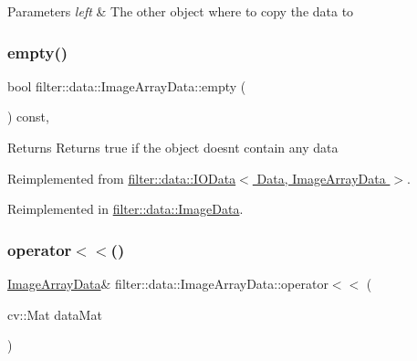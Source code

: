 \begin{DoxyParams}{Parameters}
{\em left} & The other object where to copy the data to \\
\hline
\end{DoxyParams}
\mbox{\label{classfilter_1_1data_1_1_image_array_data_ac30c0a0384b1133a8c177e399ff9d140}} 
\subsubsection{\texorpdfstring{empty()}{empty()}}
{\footnotesize\ttfamily bool filter\+::data\+::\+Image\+Array\+Data\+::empty (\begin{DoxyParamCaption}{ }\end{DoxyParamCaption}) const\hspace{0.3cm}{\ttfamily [inline]}, {\ttfamily [virtual]}}

\begin{DoxyReturn}{Returns}
Returns true if the object doesn\textquotesingle{}t contain any data 
\end{DoxyReturn}


Reimplemented from \hyperlink{classfilter_1_1data_1_1_i_o_data}{filter\+::data\+::\+I\+O\+Data$<$ Data, Image\+Array\+Data $>$}.



Reimplemented in \hyperlink{classfilter_1_1data_1_1_image_data_aa2aa6922b9cad5746a16a66e15665717}{filter\+::data\+::\+Image\+Data}.

\mbox{\label{classfilter_1_1data_1_1_image_array_data_a43e4ed2752d0ae2a1685d1f52adcebde}} 
\subsubsection{\texorpdfstring{operator$<$$<$()}{operator<<()}}
{\footnotesize\ttfamily \hyperlink{classfilter_1_1data_1_1_image_array_data}{Image\+Array\+Data}\& filter\+::data\+::\+Image\+Array\+Data\+::operator$<$$<$ (\begin{DoxyParamCaption}\item[{cv\+::\+Mat}]{data\+Mat }\end{DoxyParamCaption})\hspace{0.3cm}{\ttfamily [inline]}}



